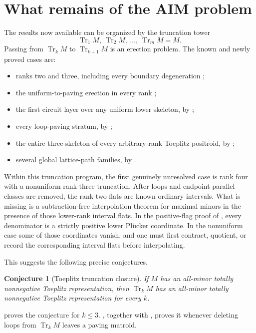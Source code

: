 \documentclass[11pt]{amsart}
\newtheorem{conjecture}[theorem]{Conjecture}
\theoremstyle{definition}
\theoremstyle{remark}
\newcommand{\Tr}{\operatorname{Tr}}
\begin{document}
\section{What remains of the AIM problem}\label{sec:remaining}

The results now available can be organized by the truncation tower
\[
 \Tr_1M,\ \Tr_2M,\ \ldots,\ \Tr_mM=M.
\]
Passing from $\Tr_kM$ to $\Tr_{k+1}M$ is an erection problem.  The known and newly proved cases are:
\begin{itemize}
\item ranks two and three, including every boundary degeneration \cite{CGQlow};
\item the uniform-to-paving erection in every rank \cite{CGQpaving};
\item the first circuit layer over any uniform lower skeleton, by ;
\item every loop-paving stratum, by ;
\item the entire three-skeleton of every arbitrary-rank Toeplitz positroid, by ;
\item several global lattice-path families, by .
\end{itemize}

Within this truncation program, the first genuinely unresolved case is rank four with a nonuniform rank-three truncation.  After loops and endpoint parallel classes are removed, the rank-two flats are known ordinary intervals.  What is missing is a subtraction-free interpolation theorem for maximal minors in the presence of those lower-rank interval flats.  In the positive-flag proof of \cite{CGQpaving}, every denominator is a strictly positive lower Pl\"ucker coordinate.  In the nonuniform case some of those coordinates vanish, and one must first contract, quotient, or record the corresponding interval flats before interpolating.

This suggests the following precise conjectures.

\begin{conjecture}[Toeplitz truncation closure]\label{conj:toeplitz-truncation}
If $M$ has an all-minor totally nonnegative Toeplitz representation, then $\Tr_kM$ has an all-minor totally nonnegative Toeplitz representation for every $k$.
\end{conjecture}

 proves the conjecture for $k\le3$.  , together with , proves it whenever deleting loops from $\Tr_kM$ leaves a paving matroid.
\end{document}
